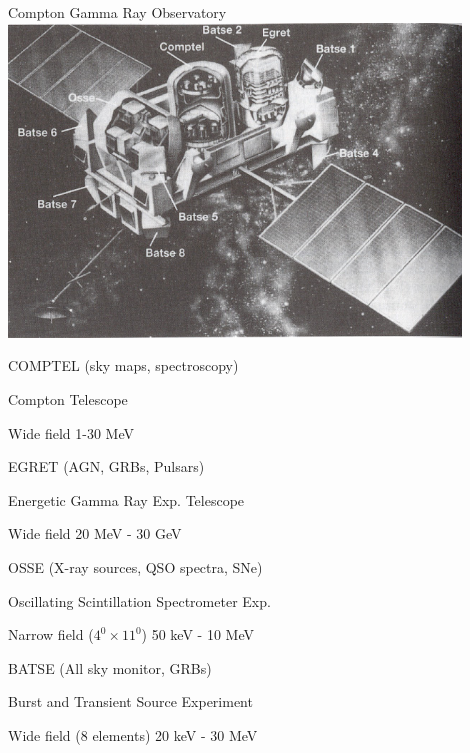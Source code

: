 \vspace*{1cm}
\begin{center}
{\blue Compton Gamma Ray Observatory}\\[5mm]
\includegraphics[keepaspectratio,width=12cm]{cgro}
\end{center}

\newpage
\vspace*{2mm}
%
\begin{itemize}
\item COMPTEL (sky maps, spectroscopy)
\item[] Compton Telescope
\item[] Wide field 1-30 MeV
{\blue
\item EGRET (AGN, GRBs, Pulsars)
\item[] Energetic Gamma Ray Exp. Telescope
\item[] Wide field 20 MeV - 30 GeV
}
\item OSSE (X-ray sources, QSO spectra, SNe)
\item[] Oscillating Scintillation Spectrometer Exp.
\item[] Narrow field ($4^{0} \times 11^{0}$) 50 keV - 10 MeV
{\blue
\item BATSE (All sky monitor, GRBs)
\item[] Burst and Transient Source Experiment
\item[] Wide field (8 elements) 20 keV - 30 MeV
}
\end{itemize}

